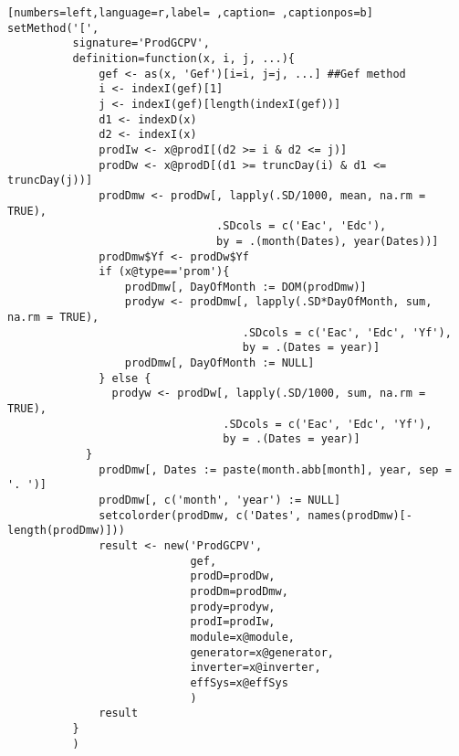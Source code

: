 \begin{lstlisting}[numbers=left,language=r,label= ,caption= ,captionpos=b]
setMethod('[',
          signature='ProdGCPV',
          definition=function(x, i, j, ...){
              gef <- as(x, 'Gef')[i=i, j=j, ...] ##Gef method
              i <- indexI(gef)[1]
              j <- indexI(gef)[length(indexI(gef))]
              d1 <- indexD(x)
              d2 <- indexI(x)
              prodIw <- x@prodI[(d2 >= i & d2 <= j)]
              prodDw <- x@prodD[(d1 >= truncDay(i) & d1 <= truncDay(j))]
              prodDmw <- prodDw[, lapply(.SD/1000, mean, na.rm = TRUE),
                                .SDcols = c('Eac', 'Edc'),
                                by = .(month(Dates), year(Dates))]
              prodDmw$Yf <- prodDw$Yf
              if (x@type=='prom'){
                  prodDmw[, DayOfMonth := DOM(prodDmw)]
                  prodyw <- prodDmw[, lapply(.SD*DayOfMonth, sum, na.rm = TRUE),
                                    .SDcols = c('Eac', 'Edc', 'Yf'),
                                    by = .(Dates = year)]
                  prodDmw[, DayOfMonth := NULL]
              } else {
                prodyw <- prodDw[, lapply(.SD/1000, sum, na.rm = TRUE),
                                 .SDcols = c('Eac', 'Edc', 'Yf'),
                                 by = .(Dates = year)]
            }
              prodDmw[, Dates := paste(month.abb[month], year, sep = '. ')]
              prodDmw[, c('month', 'year') := NULL]
              setcolorder(prodDmw, c('Dates', names(prodDmw)[-length(prodDmw)]))
              result <- new('ProdGCPV',
                            gef,
                            prodD=prodDw,
                            prodDm=prodDmw,
                            prody=prodyw,
                            prodI=prodIw,
                            module=x@module,
                            generator=x@generator,
                            inverter=x@inverter,
                            effSys=x@effSys
                            )
              result
          }
          )


\end{lstlisting}
